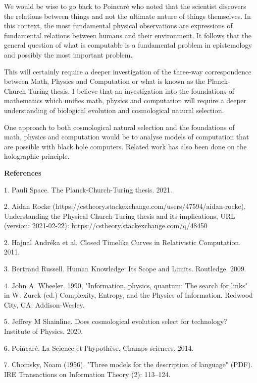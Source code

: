 \documentclass{article}
\begin{document}
We would be wise to go back to Poincaré who noted that the scientist discovers the relations between things and not
the ultimate nature of things themselves. In this context, the most fundamental physical observations are expressions
of fundamental relations between humans and their environment. It follows that the general question of what is computable
is a fundamental problem in epistemology and possibly the most important problem.

This will certainly require a deeper investigation of the three-way correspondence between Math, Physics and Computation or
what is known as the Planck-Church-Turing thesis. I believe that an investigation into the foundations of mathematics which
unifies math, physics and computation will require a deeper understanding of biological evolution and cosmological natural
selection.

One approach to both cosmological natural selection and the foundations of math, physics and computation
would be to analyse models of computation that are possible with black hole computers. Related work
has also been done on the holographic principle. 

\textbf{References}

$1.$ Pauli Space. The Planck-Church-Turing thesis. 2021.

$2.$ Aidan Rocke (https://cstheory.stackexchange.com/users/47594/aidan-rocke), Understanding the Physical Church-Turing thesis and its implications, URL (version: 2021-02-22): https://cstheory.stackexchange.com/q/48450

$2.$ Hajnal Andréka et al. Closed Timelike Curves in Relativistic Computation. 2011.

$3.$ Bertrand Russell. Human Knowledge: Its Scope and Limits. Routledge. 2009.

$4.$ John A. Wheeler, 1990, "Information, physics, quantum: The search for links" in W. Zurek (ed.) Complexity, Entropy, and the Physics of Information. Redwood City, CA: Addison-Wesley.

$5.$ Jeffrey M Shainline. Does cosmological evolution select for technology? Institute of Physics. 2020.

$6.$ Poincaré. La Science et l'hypothèse. Champs sciences. 2014.

$7.$ Chomsky, Noam (1956). "Three models for the description of language" (PDF). IRE Transactions on Information Theory (2): 113–124.
\end{document}
